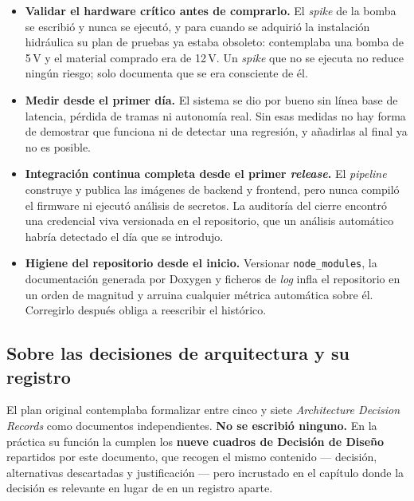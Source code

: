\begin{itemize}[leftmargin=*, label=--]
    \item \textbf{Validar el hardware crítico antes de comprarlo.} El
          \textit{spike} de la bomba se escribió y nunca se ejecutó, y para cuando
          se adquirió la instalación hidráulica su plan de pruebas ya estaba
          obsoleto: contemplaba una bomba de 5\,V y el material comprado era de
          12\,V. Un \textit{spike} que no se ejecuta no reduce ningún riesgo; solo
          documenta que se era consciente de él.
    \item \textbf{Medir desde el primer día.} El sistema se dio por bueno sin
          línea base de latencia, pérdida de tramas ni autonomía real. Sin esas
          medidas no hay forma de demostrar que funciona ni de detectar una
          regresión, y añadirlas al final ya no es posible.
    \item \textbf{Integración continua completa desde el primer
          \textit{release}.} El \textit{pipeline} construye y publica las imágenes
          de backend y frontend, pero nunca compiló el firmware ni ejecutó
          análisis de secretos. La auditoría del cierre encontró una credencial
          viva versionada en el repositorio, que un análisis automático habría
          detectado el día que se introdujo.
    \item \textbf{Higiene del repositorio desde el inicio.} Versionar
          \texttt{node\_modules}, la documentación generada por Doxygen y ficheros
          de \textit{log} infla el repositorio en un orden de magnitud y arruina
          cualquier métrica automática sobre él. Corregirlo después obliga a
          reescribir el histórico.
\end{itemize}

\subsection*{Sobre las decisiones de arquitectura y su registro}

El plan original contemplaba formalizar entre cinco y siete \textit{Architecture
Decision Records} como documentos independientes. \textbf{No se escribió ninguno.}
En la práctica su función la cumplen los \textbf{nueve cuadros de Decisión de
Diseño} repartidos por este documento, que recogen el mismo contenido --- decisión,
alternativas descartadas y justificación --- pero incrustado en el capítulo donde
la decisión es relevante en lugar de en un registro aparte.

